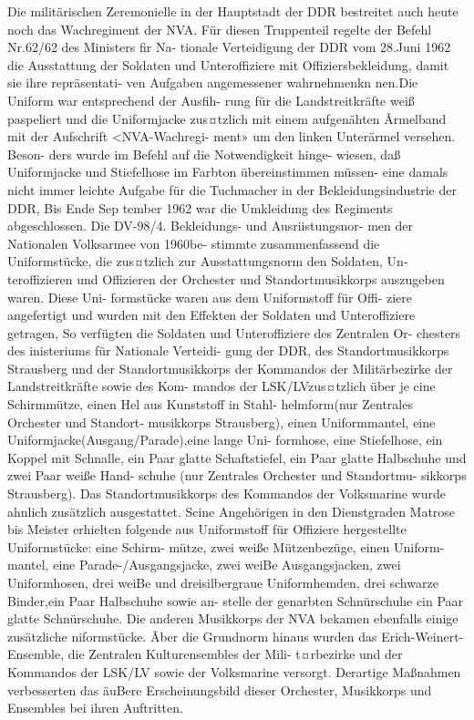 Die militärischen Zeremonielle in der Hauptstadt der DDR bestreitet auch heute noch das
Wachregiment der NVA. Für diesen Truppenteil
regelte der Befehl Nr.62/62 des Ministers fir Na-
tionale Verteidigung der DDR vom 28.Juni 1962
die Ausstattung der Soldaten und Unteroffiziere
mit Offiziersbekleidung, damit sie ihre repräsentati-
ven Aufgaben angemessener wahrnehmenkn
nen.Die Uniform war entsprechend der Ausfih-
rung für die Landstreitkräfte weiß paspeliert und
die Uniformjacke zus¤tzlich mit einem aufgenähten
Ãrmelband mit der Aufschrift <NVA-Wachregi-
ment» um den linken Unterärmel versehen. Beson-
ders wurde im Befehl auf die Notwendigkeit hinge-
wiesen, daß Uniformjacke und Stiefelhose im Farbton übereinstimmen müssen- eine damals
nicht immer leichte Aufgabe für die Tuchmacher in
der Bekleidungsindustrie der DDR, Bis Ende Sep
tember 1962 war die Umkleidung des Regiments
abgeschlossen.
Die DV-98/4. Bekleidungs- und Ausriistungsnor-
men der Nationalen Volksarmee von 1960be-
stimmte zusammenfassend die Uniformstücke, die
zus¤tzlich zur Ausstattungsnorm den Soldaten, Un-
teroffizieren und Offizieren der Orchester und
Standortmusikkorps auszugeben waren. Diese Uni-
formstücke waren aus dem Uniformstoff für Offi-
ziere angefertigt und wurden mit den Effekten der
Soldaten und Unteroffiziere getragen, So verfügten die Soldaten und Unteroffiziere des Zentralen Or-
chesters des inisteriums für Nationale Verteidi-
gung der DDR, des Standortmusikkorps Strausberg
und der Standortmusikkorps der Kommandos der
Militärbezirke der Landstreitkräfte sowie des Kom-
mandos der LSK/LVzus¤tzlich über je cine
Schirmmütze, einen Hel aus Kunststoff in Stahl-
helmform(nur Zentrales Orchester und Standort-
musikkorps Strausberg), einen Uniformmantel, eine
Uniformjacke(Ausgang/Parade),eine lange Uni-
formhose, eine Stiefelhose, ein Koppel mit
Schnalle, ein Paar glatte Schaftstiefel, ein Paar
glatte Halbschuhe und zwei Paar weiße Hand-
schuhe (nur Zentrales Orchester und Standortmu-
sikkorps Strausberg).
Das Standortmusikkorps des Kommandos der
Volksmarine wurde ahnlich zusätzlich ausgestattet.
Scine Angehörigen in den Dienstgraden Matrose
bis Meister erhielten folgende aus Uniformstoff für Offiziere hergestellte Uniformstücke: eine Schirm-
mütze, zwei weiße Mützenbezüge, einen Uniform-
mantel, eine Parade-/Ausgangsjacke, zwei weiBe
Ausgangsjacken, zwei Uniformhosen, drei weiBe
und dreisilbergraue Uniformhemden,
drei
schwarze Binder,ein Paar Halbschuhe sowie an-
stelle der genarbten Schnürschuhe cin Paar glatte
Schnürschuhe.
Die anderen Musikkorps der NVA bekamen
ebenfalls einige zusätzliche niformstücke. Ãber
die Grundnorm hinaus wurden das Erich-Weinert-
Ensemble, die Zentralen Kulturensembles der Mili-
t¤rbezirke und der Kommandos der LSK/LV sowie
der Volksmarine versorgt. Derartige Maßnahmen
verbesserten das äuBere Erscheinungsbild dieser
Orchester, Musikkorps und Ensembles bei ihren
Auftritten.